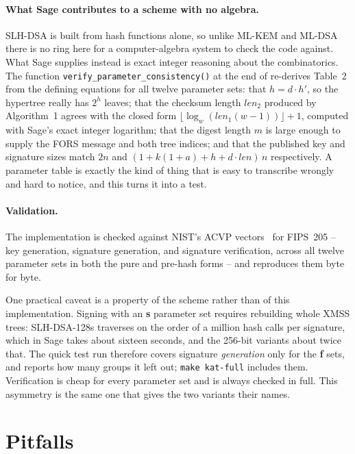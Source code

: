 \paragraph{What Sage contributes to a scheme with no algebra.}
SLH-DSA is built from hash functions alone, so unlike ML-KEM and ML-DSA there
is no ring here for a computer-algebra system to check the code against.
What Sage supplies instead is exact integer reasoning about the
combinatorics. The function \texttt{verify\_parameter\_consistency()} at the
end of 
re-derives Table~2 from the defining equations for all twelve parameter sets:
that $h = d\cdot h'$, so the hypertree really has $2^{h}$ leaves; that the
checksum length $len_2$ produced by Algorithm~1 agrees with the closed form
$\lfloor \log_w(len_1(w-1)) \rfloor + 1$, computed with Sage's exact integer
logarithm; that the digest length $m$ is large enough to supply the FORS
message and both tree indices; and that the published key and signature sizes
match $2n$ and $(1 + k(1+a) + h + d\cdot len)\,n$ respectively. A parameter
table is exactly the kind of thing that is easy to transcribe wrongly and
hard to notice, and this turns it into a test.

\paragraph{Validation.}
The implementation is checked against NIST's ACVP vectors~\cite{acvp} for FIPS~205 --
key generation, signature generation, and signature verification, across all
twelve parameter sets in both the pure and pre-hash forms -- and reproduces
them byte for byte.

One practical caveat is a property of the scheme rather than of this
implementation. Signing with an \textbf{s} parameter set
requires rebuilding whole XMSS trees: SLH-DSA-128s traverses on the order of
a million hash calls per signature, which in Sage takes about sixteen
seconds, and the 256-bit variants about twice that. The quick test run
therefore covers signature \emph{generation} only for the \textbf{f} sets,
and reports how many groups it left out; \texttt{make kat-full} includes
them. Verification is cheap for every parameter set and is always checked in
full. This asymmetry is the same one that gives the two variants their
names.

\section{Pitfalls}

